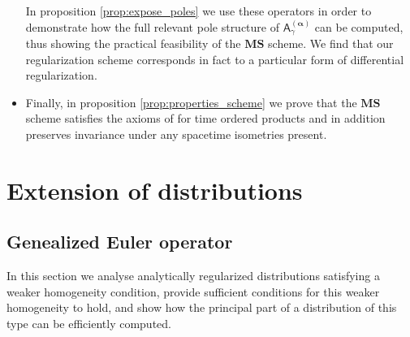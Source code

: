 \documentclass[11pt]{book}
\newcommand{\MS}{\textbf{MS}}
\newcommand{\alphabd}{\boldsymbol{\alpha}}
\newcommand{\Asf}{\mathsf{A}}
\theoremstyle{break}
\begin{document}
\begin{itemize}
In proposition \ref{prop:expose_poles} we use these operators in order to demonstrate how the full relevant pole structure of $\Asf_\gamma^{(\alphabd)}$ can be computed, thus showing the practical feasibility of the $\MS$ scheme. We find that our regularization scheme corresponds in fact to a particular form of differential regularization.


\item Finally, in proposition \ref{prop:properties_scheme} we prove that the $\MS$ scheme satisfies the axioms of \cite{hollands_local_2001,hollands_existence_2002} for time ordered products and in addition preserves invariance under any spacetime isometries present.


\end{itemize}


\section{Extension of distributions}
\label{p:EXT_DISTRIB}

\subsection{Genealized Euler operator}
\label{p:DIFFERENTIAL_EULER}


In this section we analyse analytically regularized distributions satisfying a weaker homogeneity condition, provide sufficient conditions for this weaker homogeneity to hold, and show how the principal part of a distribution of this type can be efficiently computed.


\bigskip
\end{document}
